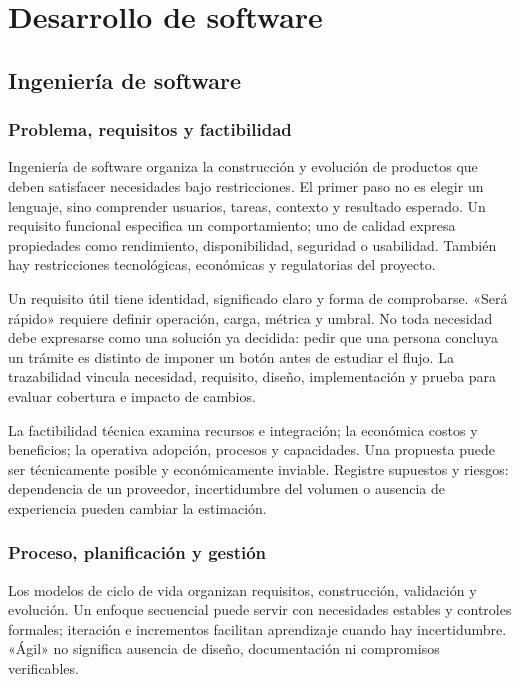 \chapter{Desarrollo de software}
\section{Ingeniería de software}\label{sec:s1}
\subsection{Problema, requisitos y factibilidad}
Ingeniería de software organiza la construcción y evolución de productos que deben satisfacer necesidades bajo restricciones. El primer paso no es elegir un lenguaje, sino comprender usuarios, tareas, contexto y resultado esperado. Un requisito funcional especifica un comportamiento; uno de calidad expresa propiedades como rendimiento, disponibilidad, seguridad o usabilidad. También hay restricciones tecnológicas, económicas y regulatorias del proyecto.

Un requisito útil tiene identidad, significado claro y forma de comprobarse. «Será rápido» requiere definir operación, carga, métrica y umbral. No toda necesidad debe expresarse como una solución ya decidida: pedir que una persona concluya un trámite es distinto de imponer un botón antes de estudiar el flujo. La trazabilidad vincula necesidad, requisito, diseño, implementación y prueba para evaluar cobertura e impacto de cambios.

La factibilidad técnica examina recursos e integración; la económica costos y beneficios; la operativa adopción, procesos y capacidades. Una propuesta puede ser técnicamente posible y económicamente inviable. Registre supuestos y riesgos: dependencia de un proveedor, incertidumbre del volumen o ausencia de experiencia pueden cambiar la estimación.

\subsection{Proceso, planificación y gestión}
Los modelos de ciclo de vida organizan requisitos, construcción, validación y evolución. Un enfoque secuencial puede servir con necesidades estables y controles formales; iteración e incrementos facilitan aprendizaje cuando hay incertidumbre. «Ágil» no significa ausencia de diseño, documentación ni compromisos verificables.


